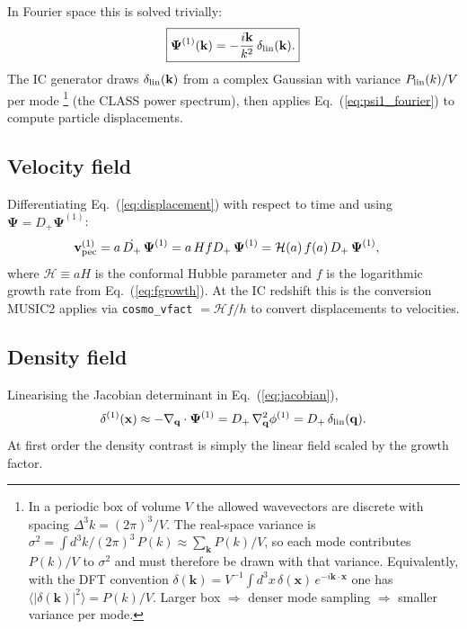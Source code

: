 \documentclass[12pt]{article}
\newcommand{\bq}{\mathbf{q}}
\newcommand{\bx}{\mathbf{x}}
\newcommand{\bk}{\mathbf{k}}
\newcommand{\bPsi}{\boldsymbol{\Psi}}
\newcommand{\bv}{\mathbf{v}}
\newcommand{\Dp}{D_+}
\newcommand{\calH}{\mathcal{H}}
\begin{document}
In Fourier space this is solved trivially:
%
\begin{equation}
  \boxed{
  \bPsi^{(1)}(\bk) = -\frac{i\bk}{k^2}\,\delta_{\rm lin}(\bk).
  }
  \label{eq:psi1_fourier}
\end{equation}
%
The IC generator draws $\delta_{\rm lin}(\bk)$ from a complex Gaussian with
variance $P_{\rm lin}(k)/V$ per mode%
\footnote{In a periodic box of volume $V$ the allowed wavevectors are
  discrete with spacing $\Delta^3k=(2\pi)^3/V$.  The real-space variance
  is $\sigma^2=\int d^3k/(2\pi)^3\,P(k)\approx\sum_\bk P(k)/V$,
  so each mode contributes $P(k)/V$ to $\sigma^2$ and must therefore
  be drawn with that variance.  Equivalently, with the DFT convention
  $\delta(\bk)=V^{-1}\!\int d^3x\,\delta(\bx)\,e^{-i\bk\cdot\bx}$
  one has $\langle|\delta(\bk)|^2\rangle=P(k)/V$.
  Larger box $\Rightarrow$ denser mode sampling $\Rightarrow$ smaller variance per mode.}
(the CLASS power spectrum), then applies
Eq.~(\ref{eq:psi1_fourier}) to compute particle displacements.

\subsection{Velocity field}

Differentiating Eq.~(\ref{eq:displacement}) with respect to time and
using $\bPsi = \Dp\bPsi^{(1)}$:
%
\begin{align}
  \bv_{\rm pec}^{(1)}
    &= a\,\dot{\Dp}\,\bPsi^{(1)}
     = a\,Hf\Dp\,\bPsi^{(1)}
     = \calH(a)\,f(a)\,\Dp\,\bPsi^{(1)},
  \label{eq:vel1}
\end{align}
%
where $\calH \equiv aH$ is the conformal Hubble parameter and $f$ is
the logarithmic growth rate from Eq.~(\ref{eq:fgrowth}).  At the IC
redshift this is the conversion MUSIC2 applies via
\texttt{cosmo\_vfact} $= \calH f / h$ to convert displacements to
velocities.

\subsection{Density field}

Linearising the Jacobian determinant in Eq.~(\ref{eq:jacobian}),
%
\begin{equation}
  \delta^{(1)}(\bx) \approx -\nabla_\bq\cdot\bPsi^{(1)}
  = \Dp\,\nabla_\bq^2\phi^{(1)}
  = \Dp\,\delta_{\rm lin}(\bq).
\end{equation}
%
At first order the density contrast is simply the linear field scaled
by the growth factor.
\end{document}
